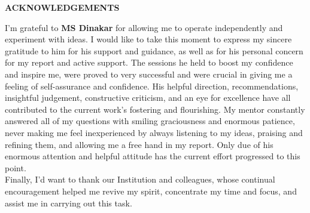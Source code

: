 
\newpage
\begin{center}
{\large \bf ACKNOWLEDGEMENTS}
\end{center}
I'm grateful to \textbf{MS Dinakar} for allowing me to operate independently and experiment with ideas. I would like to take this moment to express my sincere gratitude to him for his support and guidance, as well as for his personal concern for my report and active support. The sessions he held to boost my confidence and inspire me, were proved to very successful and were crucial in giving me a feeling of self-assurance and confidence. His helpful direction, recommendations, insightful judgement, constructive criticism, and an eye for excellence have all contributed to the current work's fostering and flourishing. My mentor constantly answered all of my questions with smiling graciousness and enormous patience, never making me feel inexperienced by always listening to my ideas, praising and refining them, and allowing me a free hand in my report. Only due of his enormous attention and helpful attitude has the current effort progressed to this point.\\
Finally, I'd want to thank our Institution and colleagues, whose continual encouragement helped me revive my spirit, concentrate my time and focus, and assist me in carrying out this task.
\newpage